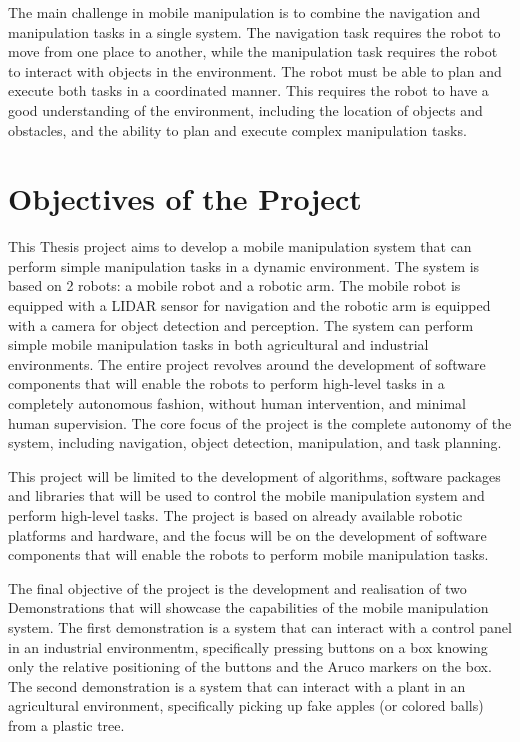 The main challenge in mobile manipulation is to combine the navigation and manipulation tasks in a single system.
The navigation task requires the robot to move from one place to another, while the manipulation task requires the robot
to interact with objects in the environment. The robot must be able to plan and execute both tasks in a coordinated manner.
This requires the robot to have a good understanding of the environment, including the location of objects and obstacles,
and the ability to plan and execute complex manipulation tasks. 

\section*{Objectives of the Project}

This Thesis project aims to develop a mobile manipulation system that can perform simple manipulation tasks in a
dynamic environment. The system is based on 2 robots: a mobile robot and a robotic arm. The mobile robot is equipped
with a LIDAR sensor for navigation and the robotic arm is equipped with a camera for object detection and perception.
The system can perform simple mobile manipulation tasks in both agricultural and industrial environments.
The entire project revolves around the development of software components that will enable the robots to perform
high-level tasks in a completely autonomous fashion, without human intervention, and minimal human supervision.
The core focus of the project is the complete autonomy of the system, including navigation, object detection, manipulation,
and task planning.

This project will be limited to the development of algorithms, software packages and libraries that will be
used to control the mobile manipulation system and perform high-level tasks. The project is based on already available
robotic platforms and hardware, and the focus will be on the development of software components that will enable the
robots to perform mobile manipulation tasks.

The final objective of the project is the development and realisation of two Demonstrations that will showcase the capabilities
of the mobile manipulation system. The first demonstration is a system that can interact with a control panel in an
industrial environmentm, specifically pressing buttons on a box knowing only the relative positioning of the buttons
and the Aruco markers on the box. The second demonstration is a system that can interact with a plant in an agricultural
environment, specifically picking up fake apples (or colored balls) from a plastic tree. 

